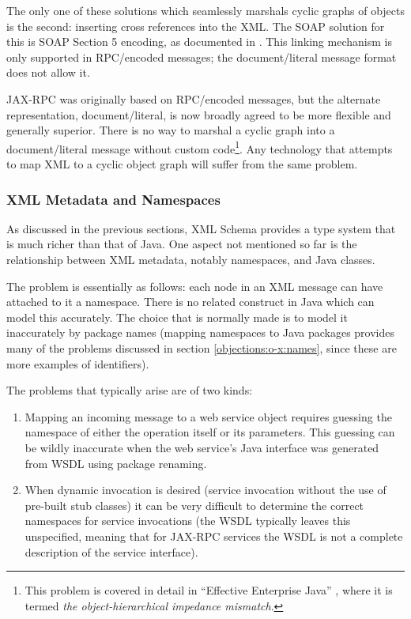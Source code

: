 The only one of these solutions which seamlessly marshals cyclic
graphs of objects is the second: inserting cross references into the
XML. The SOAP solution for this is SOAP Section 5 encoding, as
documented in \cite{spec:SOAP1.1}. This linking mechanism is only
supported in RPC/encoded messages; the document/literal message format
does not allow it.

JAX-RPC was originally based on RPC/encoded messages, but the
alternate representation, document/literal, is now broadly agreed to
be more flexible and generally superior. There is no way to marshal a
cyclic graph into a document/literal message without custom
code\footnote{This problem is covered in detail in ``Effective
Enterprise Java'' \cite{neward:EEJ}, where it is termed
\emph{the object-hierarchical impedance mismatch}.}. Any technology
that attempts to map XML to a cyclic object graph will suffer from the
same problem.

\subsubsection{XML Metadata and Namespaces}
\label{objections:o-x:namespaces}

As discussed in the previous sections, XML Schema provides a type
system that is much richer than that of Java. One aspect not mentioned
so far is the relationship between XML metadata, notably namespaces,
and Java classes.

The problem is essentially as follows: each node in an XML message can
have attached to it a namespace. There is no related construct in Java
which can model this accurately. The choice that is normally made is
to model it inaccurately by package names (mapping namespaces to Java
packages provides many of the problems discussed in section
\ref{objections:o-x:names}, since these are more examples of identifiers). 

The problems that typically arise are of two kinds:
\begin{enumerate}
\item Mapping an incoming message to a web service object requires
guessing the namespace of either the operation itself or its
parameters. This guessing can be wildly inaccurate when the web
service's Java interface was generated from WSDL using package
renaming.
\item When dynamic invocation is desired (service invocation without
the use of pre-built stub classes) it can be very difficult to
determine the correct namespaces for service invocations (the WSDL
typically leaves this unspecified, meaning that for JAX-RPC services
the WSDL is not a complete description of the service interface).
\end{enumerate}

